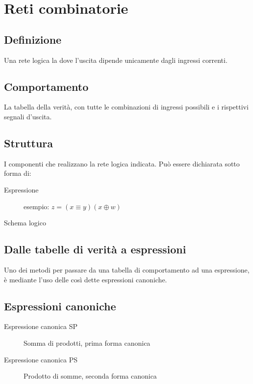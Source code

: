 \documentclass{subfiles}
\begin{document}
\section{Reti combinatorie}

\subsection{Definizione}

Una rete logica la dove l'uscita dipende unicamente dagli ingressi correnti.

\subsection{Comportamento}

La tabella della verità, con tutte le combinazioni di ingressi possibili e i rispettivi segnali d'uscita.

\subsection{Struttura}

I componenti che realizzano la rete logica indicata. Può essere dichiarata sotto forma di:

\begin{description}
	\item[Espressione] esempio: $z = (x \equiv y)(x \oplus w)$
	\item[Schema logico]
\end{description}

\subsection{Dalle tabelle di verità a espressioni}

Uno dei metodi per passare da una tabella di comportamento ad una espressione, è mediante l'uso delle così dette espressioni canoniche.

\subsection{Espressioni canoniche}

\begin{description}
	\item[Espressione canonica SP] Somma di prodotti, prima forma canonica
	\item[Espressione canonica PS] Prodotto di somme, seconda forma canonica
\end{description}
\end{document}
